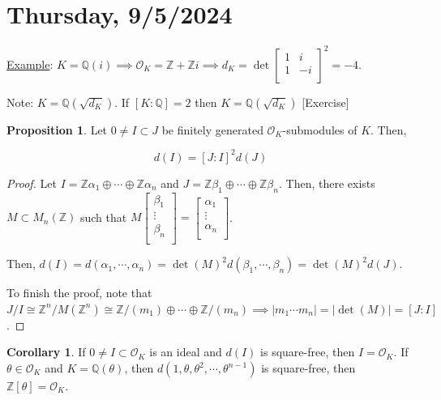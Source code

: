 \documentclass[openany]{amsbook}
\numberwithin{section}{chapter}
\theoremstyle{definition}
\newtheorem{proposition}[theorem]{Proposition}
\newtheorem{corollary}[theorem]{Corollary}
\begin{document}
\section*{Thursday, 9/5/2024}

\underline{Example}: \(K = \mathbb{Q} (i) \implies \mathcal{O}_K = \mathbb{Z}  + \mathbb{Z} i \implies d_K = \det \begin{bmatrix}
    1 &  i \\
    1 &  -i \\
\end{bmatrix}^2 = -4\).

Note: \(K = \mathbb{Q} (\sqrt{d_K})\). If \([K : \mathbb{Q}] = 2\) then \(K = \mathbb{Q}(\sqrt{d_K} )\) [Exercise]

\begin{proposition}
    Let \(0 \neq I \subset J\) be finitely generated \(\mathcal{O}_K\)-submodules of \(K\). Then,
    
    \[
        d(I) = [J : I]^2 d(J)
    \]
\end{proposition}

\begin{proof}
    Let \(I = \mathbb{Z} \alpha_1 \oplus \cdots \oplus \mathbb{Z} \alpha_n\) and \(J = \mathbb{Z} \beta_1 \oplus \cdots \oplus \mathbb{Z} \beta _n\). Then, there exists \(M \subset M_n(\mathbb{Z})\) such that \(M \begin{bmatrix}
         \beta_1 \\
         \vdots \\
         \beta_n \\
    \end{bmatrix} = \begin{bmatrix}
         \alpha_1 \\
         \vdots \\
         \alpha _n \\
    \end{bmatrix}\). 
    
    Then, \(d(I) = d(\alpha_1, \cdots , \alpha_n) = \det(M)^2 d(\beta_1, \cdots , \beta_n) = \det(M)^2 d(J)\). 
    
    To finish the proof, note that \(J / I \cong \mathbb{Z}^n / M(\mathbb{Z}^n) \cong \mathbb{Z}/(m_1) \oplus \cdots \oplus \mathbb{Z}/(m_n) \implies \vert m_1 \cdots m_n \vert = \vert \det(M) \vert = [J : I]\).

\end{proof}

\begin{corollary}
    If \(0 \neq I \subset \mathcal{O}_K\) is an ideal and \(d(I)\) is square-free, then \(I = \mathcal{O}_K\). If \(\theta \in \mathcal{O}_K\) and \(K = \mathbb{Q}(\theta)\), then \(d(1, \theta , \theta^2, \cdots , \theta^{n-1})\) is square-free, then \(\mathbb{Z}[\theta] =  \mathcal{O}_K\).  
\end{corollary}
\end{document}
